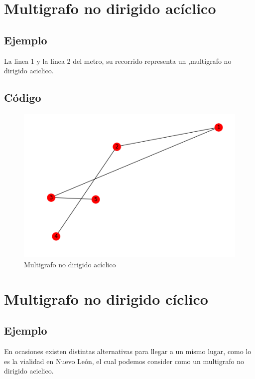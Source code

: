 \documentclass[10pt,a4paper]{article}
\begin{document}
\section{Multigrafo no dirigido acíclico}
\subsection{Ejemplo} La linea 1 y la linea 2 del metro, su recorrido representa un ,multigrafo no dirigido aciclico.
\subsection{Código}
\begin{figure}[H]
\centering
\includegraphics[scale=.5]{multigrafonodirigidoaciclico}
\caption{Multigrafo no dirigido acíclico}
\end{figure}

\section{Multigrafo no dirigido cíclico}
\subsection{Ejemplo} En ocasiones existen distintas alternativas para llegar a un mismo lugar, como lo es la vialidad en Nuevo León, el cual podemos consider como un multigrafo no dirigido aciclico. 
\end{document}
